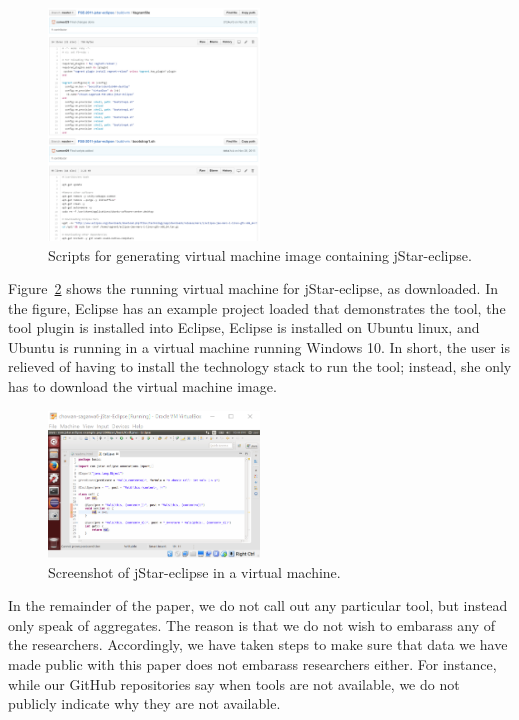 \documentclass[10pt,conference]{IEEEtran}
\begin{document}
\begin{figure}[t]
  \centering
    \includegraphics[width=0.5\textwidth]{vagrant.png}
  \caption{Scripts for generating virtual machine image containing jStar-eclipse.}\label{fig:vagrant}
\end{figure}

Figure~\ref{fig:vm} shows the running virtual machine
for jStar-eclipse, as downloaded.
In the figure, 
Eclipse has an example project loaded that demonstrates
the tool, 
the tool plugin is installed into Eclipse,
Eclipse is installed on Ubuntu linux,
and Ubuntu is running in a virtual machine
running Windows 10. 
In short, the user is relieved of having to install
the technology stack to run the tool; instead, 
she only has to download the virtual machine image.

\begin{figure}[t]
  \centering
    \includegraphics[width=0.5\textwidth]{vm.png}
  \caption{Screenshot of jStar-eclipse in a virtual machine.}\label{fig:vm}
\end{figure}

In the remainder of the paper, we do not call out 
any particular tool, but instead only speak of aggregates.
The reason is that we do not wish to embarass any of the researchers.
Accordingly, we have taken steps to make sure that data we have made 
public with this paper does not embarass researchers either.
For instance, while our GitHub repositories say when tools are 
not available, we do not publicly indicate why they are
not available.
\end{document}
